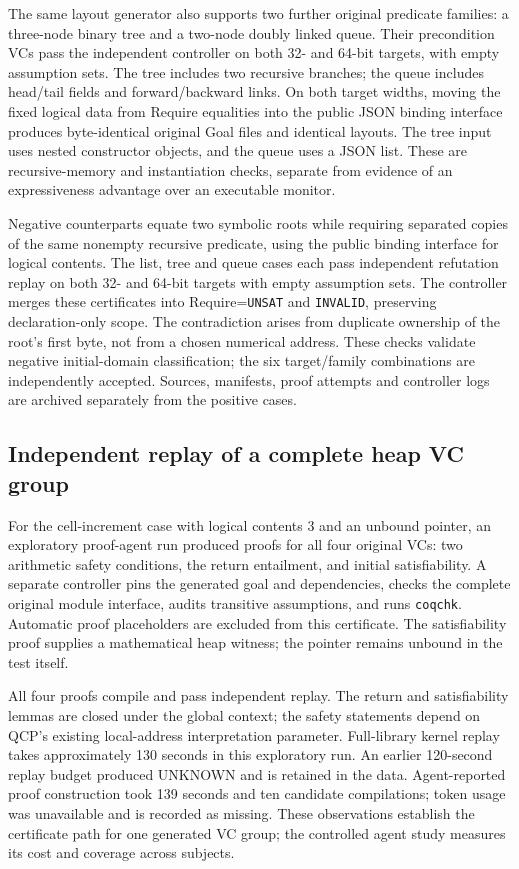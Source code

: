 The same layout generator also supports two further original predicate
families: a three-node binary tree and a two-node doubly linked queue. Their
precondition VCs pass the independent controller on both 32- and 64-bit
targets, with empty assumption sets. The tree includes two recursive branches; the queue includes head/tail
fields and forward/backward links. On both target widths, moving the fixed
logical data from Require equalities into the public JSON binding interface
produces byte-identical original Goal files and identical layouts. The tree
input uses nested constructor objects, and the queue uses a JSON list. These
are recursive-memory and instantiation checks, separate from evidence of an
expressiveness advantage over an executable monitor.

Negative counterparts equate two symbolic roots while requiring separated
copies of the same nonempty recursive predicate, using the public binding
interface for logical contents. The list, tree and queue cases each pass
independent refutation replay on both 32- and 64-bit targets with empty
assumption sets. The controller
merges these certificates into Require=\texttt{UNSAT} and
\texttt{INVALID}, preserving declaration-only scope. The contradiction arises
from duplicate ownership of the root's first byte, not from a chosen numerical
address. These checks validate negative initial-domain classification; the
six target/family combinations are independently accepted. Sources, manifests, proof
attempts and controller logs are archived separately from the positive cases.

\subsection{Independent replay of a complete heap VC group}

For the cell-increment case with logical contents $3$ and an unbound pointer,
an exploratory proof-agent run produced proofs for all four original VCs:
two arithmetic safety conditions, the return entailment, and initial
satisfiability. A separate controller pins the generated goal and dependencies,
checks the complete original module interface, audits transitive assumptions,
and runs \texttt{coqchk}. Automatic proof placeholders are excluded from this
certificate. The satisfiability proof supplies a mathematical heap witness;
the pointer remains unbound in the test itself.

All four proofs compile and pass independent replay. The return and
satisfiability lemmas are closed under the global context; the safety statements
depend on QCP's existing local-address interpretation parameter. Full-library
kernel replay takes approximately 130 seconds in this exploratory run.
An earlier 120-second replay budget produced UNKNOWN and is retained in the
data. Agent-reported proof construction took 139 seconds and ten candidate
compilations; token usage was unavailable and is recorded as missing.
These observations establish the certificate path for one generated VC group;
the controlled agent study measures its cost and coverage across subjects.

